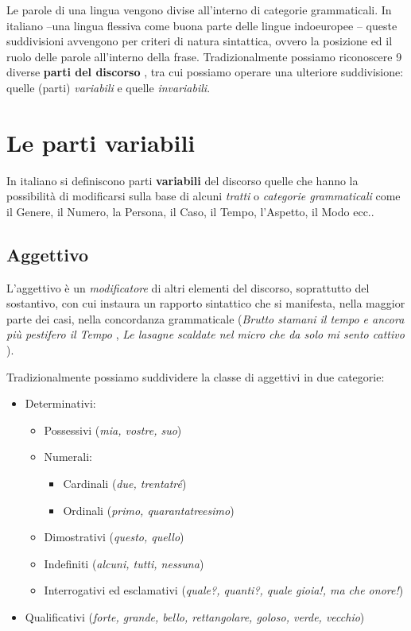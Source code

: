 \documentclass[
  a4paper,
  twoside,
  11pt,
  chapterprefix=false,
  bibliography=totocnumbered,
  listof=flat]{scrbook}
\providecommand{\tightlist}{%
  \setlength{\itemsep}{0pt}\setlength{\parskip}{0pt}}
\begin{document}
Le parole di una lingua vengono divise all'interno di categorie grammaticali. In italiano --una lingua flessiva come buona parte delle lingue indoeuropee \citep{graffiScalise2009}-- queste suddivisioni avvengono per criteri di natura sintattica, ovvero la posizione ed il ruolo delle parole all'interno della frase. Tradizionalmente possiamo riconoscere 9 diverse \textbf{parti del discorso} \citep{salvi2013}, tra cui possiamo operare una ulteriore suddivisione: quelle (parti) \emph{variabili} e quelle \emph{invariabili}.

\hypertarget{le-parti-variabili}{%
\section{Le parti variabili}\label{le-parti-variabili}}

In italiano si definiscono parti \textbf{variabili} del discorso quelle che hanno la possibilità di modificarsi sulla base di alcuni \emph{tratti} o \emph{categorie grammaticali} \citep[ Cap.9]{simone1995} come il Genere, il Numero, la Persona, il Caso, il Tempo, l'Aspetto, il Modo ecc..

\hypertarget{aggettivo}{%
\subsection{Aggettivo}\label{aggettivo}}

L'aggettivo è un \emph{modificatore} di altri elementi del discorso, soprattutto del sostantivo, con cui instaura un rapporto sintattico che si manifesta, nella maggior parte dei casi, nella concordanza grammaticale (\emph{Brutto stamani il tempo e ancora più pestifero il Tempo} \citep{montale-satura}, \emph{Le lasagne scaldate nel micro che da solo mi sento cattivo} \citep{fibra2017}).

Tradizionalmente possiamo suddividere la classe di aggettivi in due categorie:

\begin{itemize}
\tightlist
\item
  Determinativi:

  \begin{itemize}
  \tightlist
  \item
    Possessivi (\emph{mia, vostre, suo})
  \item
    Numerali:

    \begin{itemize}
    \tightlist
    \item
      Cardinali (\emph{due, trentatré})
    \item
      Ordinali (\emph{primo, quarantatreesimo})
    \end{itemize}
  \item
    Dimostrativi (\emph{questo, quello})
  \item
    Indefiniti (\emph{alcuni, tutti, nessuna})
  \item
    Interrogativi ed esclamativi (\emph{quale?, quanti?, quale gioia!, ma che onore!})
  \end{itemize}
\item
  Qualificativi (\emph{forte, grande, bello, rettangolare, goloso, verde, vecchio})
\end{itemize}
\end{document}
